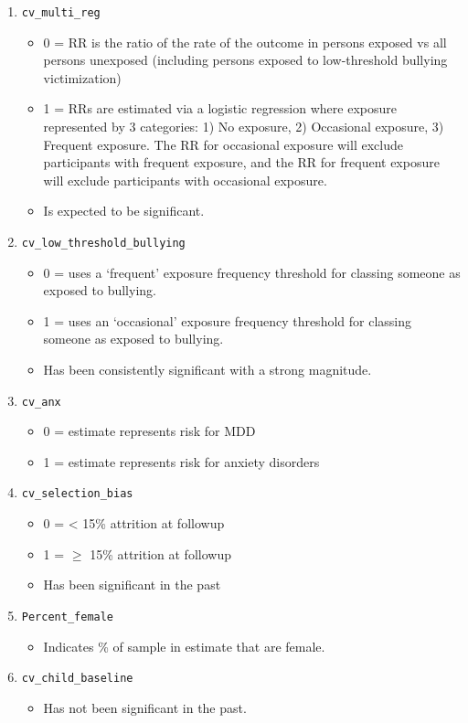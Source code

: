 \begin{enumerate}
	\item \texttt{cv\_multi\_reg}
	\begin{itemize}
		\item 0 = RR is the ratio of the rate of the outcome in persons exposed vs all persons unexposed (including persons exposed to low-threshold bullying victimization)
		\item 1 =  RRs are estimated via a logistic regression where exposure represented by 3 categories: 1) No exposure, 2) Occasional exposure, 3) Frequent exposure. The RR for occasional exposure will exclude participants with frequent exposure, and the RR for frequent exposure will exclude participants with occasional exposure. 
		\item Is expected to be significant.
	\end{itemize}
	\item \texttt{cv\_low\_threshold\_bullying}
	\begin{itemize}
		\item 0 = uses a ‘frequent’ exposure frequency threshold for classing someone as exposed to bullying.
		\item 1 = uses an ‘occasional’ exposure frequency threshold for classing someone as exposed to bullying.
		\item Has been consistently significant with a strong magnitude.
	\end{itemize}
	\item \texttt{cv\_anx}
	\begin{itemize}
		\item 0 = estimate represents risk for MDD
		\item 1 = estimate represents risk for anxiety disorders
	\end{itemize}
	\item \texttt{cv\_selection\_bias}
	\begin{itemize}
		\item 0 = < 15\% attrition at followup
		\item 1 = $\geqslant$ 15\% attrition at followup
		\item Has been significant in the past
	\end{itemize}
	\item \texttt{Percent\_female}
	\begin{itemize}
		\item Indicates \% of sample in estimate that are female. 
	\end{itemize}
	\item \texttt{cv\_child\_baseline}
	\begin{itemize}
		\item Has not been significant in the past.
	\end{itemize}
\end{enumerate}
